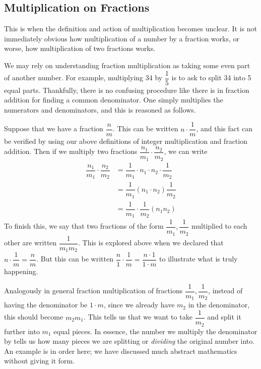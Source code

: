 \documentclass[openany]{book}
\begin{document}
\subsection{Multiplication on Fractions}
This is when the definition and action of multiplication becomes unclear. It is not immediately obvious how multiplication of a number by a fraction works, or worse, how multiplication of two fractions works.\par
We may rely on understanding fraction multiplication as taking some even part of another number. For example, multiplying 34 by $\dfrac{1}{5}$ is to ask to split 34 into 5 equal parts. Thankfully, there is no confusing procedure like there is in fraction addition for finding a common denominator. One simply multiplies the numerators and denominators, and this is reasoned as follows.\par
Suppose that we have a fraction $\dfrac{n}{m}$. This can be written $n\cdot\dfrac{1}{m}$, and this fact can be verified by using our above definitions of integer multiplication and fraction addition. Then if we multiply two fractions $\dfrac{n_{1}}{m_{1}}\cdot\dfrac{n_{2}}{m_{2}}$, we can write
	\begin{align}
	\dfrac{n_{1}}{m_{1}}\cdot\dfrac{n_{2}}{m_{2}} &= \dfrac{1}{m_{1}}\cdot n_{1}\cdot n_{2}\cdot\dfrac{1}{m_{2}}\\
		&= \dfrac{1}{m_{1}}(n_{1}\cdot n_{2})\dfrac{1}{m_{2}} \tag{by Associative Property of Multiplication}\\
		&= \dfrac{1}{m_{1}}\cdot\dfrac{1}{m_{2}}(n_{1}n_{2}) \tag{by Commutative Property of Multiplication}
	\end{align}
To finish this, we say that two fractions of the form $\dfrac{1}{m_{1}},\dfrac{1}{m_{2}}$ multiplied to each other are written $\dfrac{1}{m_{1}m_{2}}$. This is explored above when we declared that $n\cdot\dfrac{1}{m} = \dfrac{n}{m}$. But this can be written $\dfrac{n}{1}\cdot\dfrac{1}{m} = \dfrac{n\cdot1}{1\cdot m}$ to illustrate what is truly happening.\par
Analogously in general fraction multiplication of fractions $\dfrac{1}{m_{1}},\dfrac{1}{m_{2}}$, instead of having the denominator be $1\cdot m$, since we already have $m_{2}$ in the denominator, this should become $m_{2}m_{1}$. This tells us that we want to take $\dfrac{1}{m_{2}}$ and split it further into $m_{1}$ equal pieces. In essence, the number we multiply the denominator by tells us how many pieces we are splitting or \textit{dividing} the original number into. An example is in order here; we have discussed much abstract mathematics without giving it form.
\end{document}
